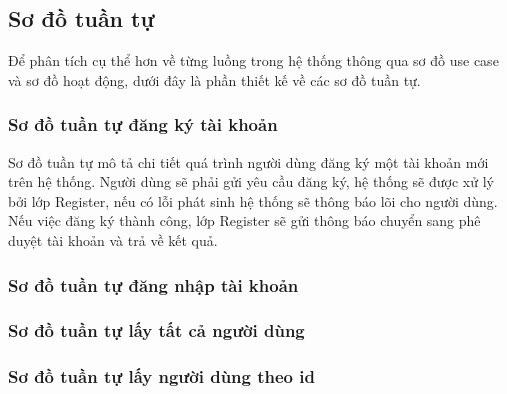 \subsection{Sơ đồ tuần tự}
Để phân tích cụ thể hơn về từng luồng trong hệ thống thông qua sơ đồ use case và sơ đồ hoạt động, dưới đây là phần thiết kế
 về các sơ đồ tuần tự.

\subsubsection{Sơ đồ tuần tự đăng ký tài khoản}

Sơ đồ tuần tự mô tả chi tiết quá trình người dùng đăng ký một tài khoản mới trên hệ thống. Người dùng sẽ phải gửi yêu cầu đăng ký, hệ thống sẽ được xử lý
bởi lớp Register, nếu có lỗi phát sinh hệ thống sẽ thông báo lõi cho người dùng. Nếu việc đăng ký thành công, lớp Register sẽ gửi thông báo 
chuyển sang phê duyệt tài khoản và trả về kết quả.  


\subsubsection{Sơ đồ tuần tự đăng nhập tài khoản}
\subsubsection{Sơ đồ tuần tự lấy tất cả người dùng}

\subsubsection{Sơ đồ tuần tự lấy người dùng theo id}

